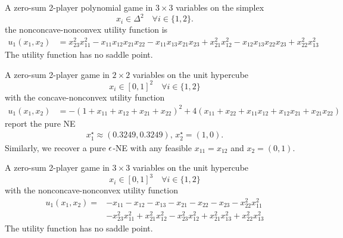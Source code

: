 \begin{game}\label{ex.nie21.6.1.iv}

A zero-sum 2-player polynomial game in $3 \times 3$ variables on the simplex
\[
x_i \in \Delta^{2} \quad \forall i \in \{1,2\}.
\]
the nonconcave-nonconvex utility function \cite[Example~6.1 (iv)]{nie.yang.ea:saddle} is
\begin{align*}
u_{1}\left( x_{1}, x_{2} \right) &= x_{23}^{2} x_{11}^{2} - x_{11} x_{12} x_{21} x_{22} - x_{11} x_{13} x_{21} x_{23} + x_{21}^{2} x_{12}^{2} - x_{12} x_{13} x_{22} x_{23} + x_{22}^{2} x_{13}^{2}
\end{align*}
The utility function has no saddle point.
\end{game}

\begin{game}\label{ex.nie21.6.2.i}

A zero-sum 2-player game in $2 \times 2$ variables on the unit hypercube
\[
x_i \in [0,1]^2 \quad \forall i \in \{1,2\}
\]
with the concave-nonconvex utility function
\begin{align*}
u_{1}\left( x_{1}, x_{2} \right) &=  - \left( 1 + x_{11} + x_{12} + x_{21} + x_{22} \right)^{2} + 4 \left( x_{11} + x_{22} + x_{11} x_{12} + x_{12} x_{21} + x_{21} x_{22} \right)
\end{align*}
\textcite[Example~6.2 (i)]{nie.yang.ea:saddle} report the pure NE
\begin{align*}
x_1^\star \approx (0.3249, 0.3249),\, x_2^\star = (1,0).
\end{align*}
Similarly, we recover a pure $\epsilon$-NE with any feasible $x_{11} = x_{12}$ and $x_2=(0,1)$.
\end{game}

\begin{game}\label{ex.nie21.6.2.ii}

A zero-sum 2-player game in $3 \times 3$ variables on the unit hypercube
\[
x_i \in [0,1]^3 \quad \forall i \in \{1,2\}
\]
with the nonconcave-nonconvex utility function \cite[Example~6.2 (ii)]{nie.yang.ea:saddle}
\begin{align*}
u_{1}\left( x_{1}, x_{2} \right) =  &- x_{11} - x_{12} - x_{13} - x_{21} - x_{22} - x_{23} - x_{22}^{2} x_{11}^{2} \\
&- x_{23}^{2} x_{11}^{2} + x_{21}^{2} x_{12}^{2} - x_{23}^{2} x_{12}^{2} + x_{21}^{2} x_{13}^{2} + x_{22}^{2} x_{13}^{2}
\end{align*}
The utility function has no saddle point.
\end{game}


